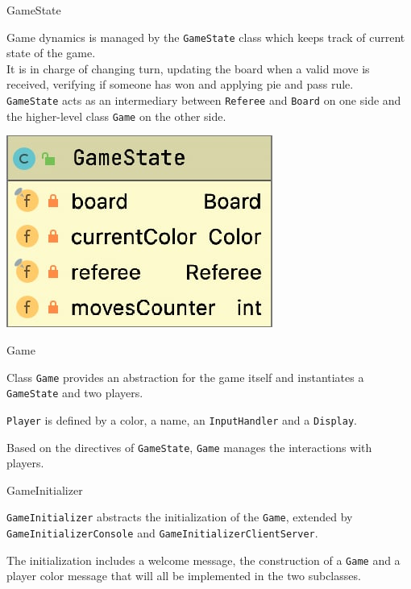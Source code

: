\documentclass{beamer}
\begin{document}
\begin{frame}{GameState}
     
     Game dynamics is managed by the \texttt{GameState} class which keeps track of current state of the game.
     \vspace{0.4cm}
     \\It is in charge of changing turn, updating the board when a valid move is received, verifying if someone has won and applying pie and pass rule.
     \vspace{0.4cm}
     \\ \texttt{GameState} acts as an intermediary between \texttt{Referee} and \texttt{Board} on one side and the higher-level class \texttt{Game} on the other 	side.
     \begin{center}
     	\includegraphics[scale=0.32]{images/gamestate.png}
     \end{center}
\end{frame}

\begin{frame}{Game}

	Class \texttt{Game} provides an abstraction for the game itself and instantiates a \texttt{GameState} and two players.
	
	 \texttt{Player} is defined by a color, a name, an \texttt{InputHandler} and a \texttt{Display}.
	 
	Based on the directives of \texttt{GameState}, \texttt{Game} manages the interactions with players.
\end{frame}

\begin{frame}{GameInitializer}

	\texttt{GameInitializer} abstracts the initialization of the \texttt{Game}, extended by \texttt{GameInitializerConsole} and \texttt{GameInitializerClientServer}.
	
	The initialization includes a welcome message, the construction of a \texttt{Game} and a player color message that will all be implemented in the two subclasses. 

\end{frame}
\end{document}
